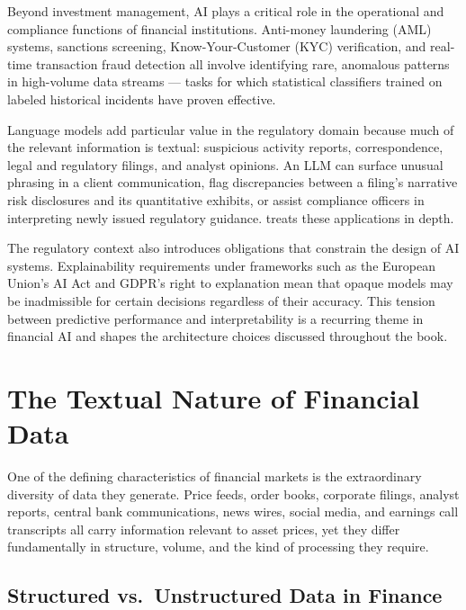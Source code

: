 Beyond investment management, AI plays a critical role in the operational
and compliance functions of financial institutions.  Anti-money laundering
(AML) systems, sanctions screening, Know-Your-Customer (KYC) verification,
and real-time transaction fraud detection all involve identifying rare,
anomalous patterns in high-volume data streams --- tasks for which
statistical classifiers trained on labeled historical incidents have proven
effective.

Language models add particular value in the regulatory domain because
much of the relevant information is textual: suspicious activity reports,
correspondence, legal and regulatory filings, and analyst opinions.  An
LLM can surface unusual phrasing in a client communication, flag
discrepancies between a filing's narrative risk disclosures and its
quantitative exhibits, or assist compliance officers in interpreting
newly issued regulatory guidance.   treats these applications
in depth.

The regulatory context also introduces obligations that constrain the
design of AI systems.  Explainability requirements under frameworks such
as the European Union's AI Act and GDPR's right to explanation mean that
opaque models may be inadmissible for certain decisions regardless of their
accuracy.  This tension between predictive performance and interpretability
is a recurring theme in financial AI and shapes the architecture choices
discussed throughout the book.

\section{The Textual Nature of Financial Data}
\label{sec:textual-finance}

One of the defining characteristics of financial markets is the
extraordinary diversity of data they generate.  Price feeds, order books,
corporate filings, analyst reports, central bank communications, news
wires, social media, and earnings call transcripts all carry information
relevant to asset prices, yet they differ fundamentally in structure,
volume, and the kind of processing they require.

\subsection{Structured vs.\ Unstructured Data in Finance}
\label{subsec:structured-unstructured}

